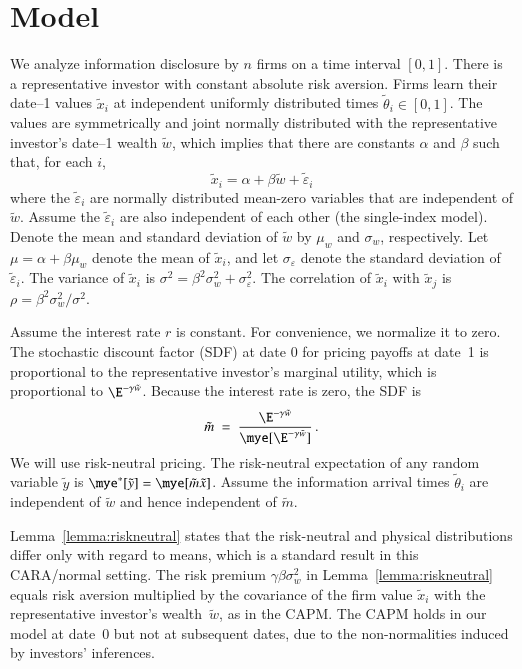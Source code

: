 \documentclass[authoryear,letterpaper,english,12pt]{elsarticle}
\begin{document}
\section{Model}\label{s:model}




We analyze information disclosure by $n$ firms on a time interval $[0,1]$.  There is a representative investor with constant absolute risk aversion.
Firms learn their date--1 values $\tilde x_i$ at independent uniformly distributed times $\tilde \theta_i \in [0,1]$.  The values are symmetrically and joint normally distributed with the representative investor's date--1 wealth $\tilde w$, which implies that there are constants $\alpha$ and $\beta$ such that, for each $i$,
\begin{equation}
  \tilde x_i =  \alpha + \beta  \tilde w + \tilde \varepsilon_i
\end{equation} 
where the $\tilde \varepsilon_i$ are normally distributed mean-zero variables that are independent of $ \tilde w$.  Assume the $\tilde \varepsilon_i$ are also independent of each other (the single-index model).   Denote the mean and standard deviation of $\tilde w$ by $\mu_w$ and $\sigma_w$, respectively.
Let $\mu= \alpha + \beta \mu_w$ denote the mean of $\tilde x_i$, and let  $\sigma_\varepsilon$ denote the standard deviation of $\tilde \varepsilon_i$.  The variance of $\tilde x_i$ is $\sigma^2 =  \beta^2\sigma_w^2 + \sigma_\varepsilon^2$.  
The correlation of $\tilde x_i$ with $\tilde x_j$ is $\rho = \beta^2\sigma_w^2/\sigma^2$.

Assume the interest rate $r$ is constant.  For convenience, we normalize it to zero.
The stochastic discount factor (SDF) at date 0 for pricing payoffs at date~1 is proportional to the representative investor's marginal utility, which is proportional to  $\E^{-\gamma \tilde w}$.  Because the interest rate is zero, the SDF is 
\begin{equation}
 \tilde m \ = \ \frac{\E^{-\gamma \tilde w}}{\mye[\E^{-\gamma \tilde w}]}\,.
\end{equation}
  We will use risk-neutral pricing.  The risk-neutral expectation of any random variable $\tilde y$ is $\mye^*[\tilde y] = \mye[\tilde m\tilde x]$.
  Assume the information arrival times $\tilde \theta_i$ are independent of $\tilde w$ and hence independent of $\tilde m$.
  
  Lemma~\ref{lemma:riskneutral} states that  the risk-neutral and physical distributions differ only with regard to means, which is a standard result in this CARA/normal setting. The risk premium $\gamma\beta\sigma_w^2$ in Lemma~\ref{lemma:riskneutral} equals risk aversion multiplied by the covariance of the firm value $\tilde x_i$ with the representative investor's wealth~$\tilde w$, as in the CAPM.  The CAPM holds in our model at date~0 but not at subsequent dates, due to the non-normalities induced by investors' inferences.
\end{document}
